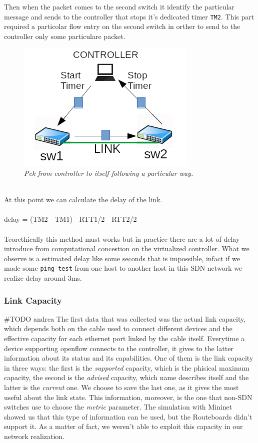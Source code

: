 \documentclass[conference,10pt]{IEEEtran}
\begin{document}
Then when the packet comes to the second switch it identify the particular message and sends to the controller that stops it's dedicated timer \texttt{TM2}.
\newline This part required a particolar flow entry on the second switch in orther to send to the controller only some particulare packet.
\begin{figure}[!h]
 \centering
 \includegraphics[scale=0.70]{images/rtt1.png}
 \caption{\emph{Pck from controller to itself following a particular way.}}
 \label{fig:topo}
\end{figure}
\\
\newline At this point we can calculate the delay of the link.
\\
\\
 delay = (TM2 - TM1) - RTT1/2 - RTT2/2
\\
\\
Teorethically this method must works but in practice there are a lot of delay introduce from computational concestion on the virtualized controller.
What we observe is a estimated delay like some seconds that is impossible, infact if we made some \texttt{ping test} from one host to another host 
in this SDN network we realize delay around 3ms.
\\

		\subsubsection{Link Capacity}

		\#TODO andrea
		The first data that was collected was the actual link capacity, which depends both on the cable used to connect
		different devices and the effective capacity for each ethernet port linked by the cable itself. Everytime a device supporting
		openflow connects to the controller, it gives to the latter information about its status and its capabilities. One of them is
		the link capacity in three ways: the first is the \textit{supported} capacity, which is the phisical maximum capacity, the second is the
		\textit{advised} capacity, which name describes itself and the latter is the \textit{current} one. We choose to save the last one,
		as it gives the most useful about the link state. This information, moreover, is the one that non-SDN switches use to choose the \textit{metric}
		parameter. The simulation with Mininet showed us that this type of information can be used, but the Routeboards didn't support it.
		As a matter of fact, we weren't able to exploit this capacity in our network realization.
		\\
		\\
\end{document}
